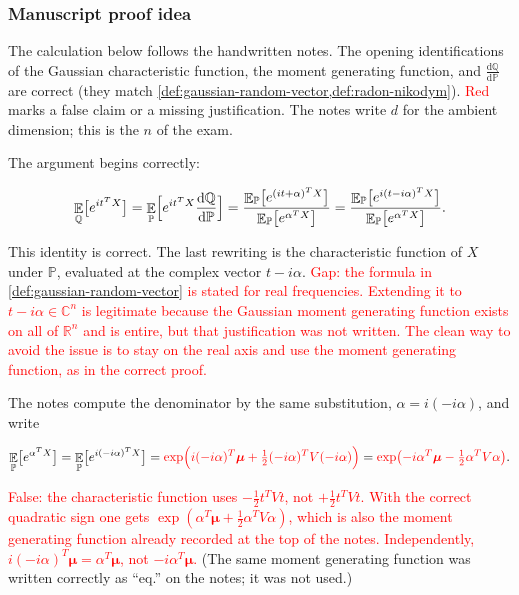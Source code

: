 \documentclass[11pt,a4paper]{article}
\newcommand{\mserr}[1]{\textcolor{red}{#1}}
\DeclareMathOperator{\E}{\mathbb{E}}
\begin{document}
\subsubsection{Manuscript proof idea}

The calculation below follows the handwritten notes. The opening identifications of the Gaussian characteristic function, the moment generating function, and \(\frac{\mathrm{d}\mathbb{Q}}{\mathrm{d}\mathbb{P}}\) are correct (they match \cref{def:gaussian-random-vector,def:radon-nikodym}). \mserr{Red} marks a false claim or a missing justification. The notes write \(d\) for the ambient dimension; this is the \(n\) of the exam.

The argument begins correctly:

\[
\E_{\mathbb{Q}}\bigl[e^{it^{T}X}\bigr]
=
\E_{\mathbb{P}}\Bigl[e^{it^{T}X}\frac{\mathrm{d}\mathbb{Q}}{\mathrm{d}\mathbb{P}}\Bigr]
=
\frac{\E_{\mathbb{P}}\bigl[e^{(it+\alpha)^{T}X}\bigr]}{\E_{\mathbb{P}}\bigl[e^{\alpha^{T}X}\bigr]}
=
\frac{\E_{\mathbb{P}}\bigl[e^{i(t-i\alpha)^{T}X}\bigr]}{\E_{\mathbb{P}}\bigl[e^{\alpha^{T}X}\bigr]}.
\]

This identity is correct. The last rewriting is the characteristic function of \(X\) under \(\mathbb{P}\), evaluated at the complex vector \(t-i\alpha\). \mserr{Gap: the formula in \cref{def:gaussian-random-vector} is stated for real frequencies. Extending it to \(t-i\alpha\in\mathbb{C}^{n}\) is legitimate because the Gaussian moment generating function exists on all of \(\mathbb{R}^{n}\) and is entire, but that justification was not written. The clean way to avoid the issue is to stay on the real axis and use the moment generating function, as in the correct proof.}

The notes compute the denominator by the same substitution, \(\alpha=i(-i\alpha)\), and write

\[
\E_{\mathbb{P}}\bigl[e^{\alpha^{T}X}\bigr]
=
\E_{\mathbb{P}}\bigl[e^{i(-i\alpha)^{T}X}\bigr]
=
\mserr{\exp\Bigl(i(-i\alpha)^{T}\bm{\mu}+\tfrac12(-i\alpha)^{T}V(-i\alpha)\Bigr)}
=
\mserr{\exp\bigl(-i\alpha^{T}\bm{\mu}-\tfrac12\alpha^{T}V\alpha\bigr)}.
\]

\mserr{False: the characteristic function uses \(-\frac12 t^{T}Vt\), not \(+\frac12 t^{T}Vt\). With the correct quadratic sign one gets \(\exp(\alpha^{T}\bm{\mu}+\frac12\alpha^{T}V\alpha)\), which is also the moment generating function already recorded at the top of the notes. Independently, \(i(-i\alpha)^{T}\bm{\mu}=\alpha^{T}\bm{\mu}\), not \(-i\alpha^{T}\bm{\mu}\).} (The same moment generating function was written correctly as ``eq.'' on the notes; it was not used.)
\end{document}
